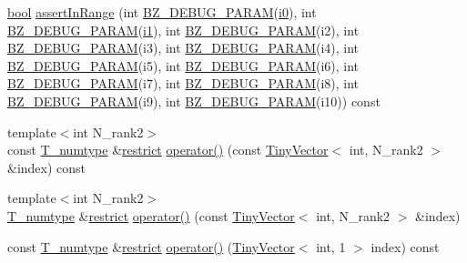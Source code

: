 \begin{DoxyCompactItemize}
\item 
\hyperlink{compiler_8h_abb452686968e48b67397da5f97445f5b}{bool} \hyperlink{classArray_ac1601ef44f92cc6b7bb767afbb1f159b}{assert\+In\+Range} (int \hyperlink{bzdebug_8h_a8da20913b848afd5500d54e384544e20}{B\+Z\+\_\+\+D\+E\+B\+U\+G\+\_\+\+P\+A\+R\+A\+M}(\hyperlink{cephes_8h_aacd2643d920288e61be16787561a4514}{i0}), int \hyperlink{bzdebug_8h_a8da20913b848afd5500d54e384544e20}{B\+Z\+\_\+\+D\+E\+B\+U\+G\+\_\+\+P\+A\+R\+A\+M}(\hyperlink{cephes_8h_ab24474d03df1f9adf1700c2c1badd1a5}{i1}), int \hyperlink{bzdebug_8h_a8da20913b848afd5500d54e384544e20}{B\+Z\+\_\+\+D\+E\+B\+U\+G\+\_\+\+P\+A\+R\+A\+M}(i2), int \hyperlink{bzdebug_8h_a8da20913b848afd5500d54e384544e20}{B\+Z\+\_\+\+D\+E\+B\+U\+G\+\_\+\+P\+A\+R\+A\+M}(i3), int \hyperlink{bzdebug_8h_a8da20913b848afd5500d54e384544e20}{B\+Z\+\_\+\+D\+E\+B\+U\+G\+\_\+\+P\+A\+R\+A\+M}(i4), int \hyperlink{bzdebug_8h_a8da20913b848afd5500d54e384544e20}{B\+Z\+\_\+\+D\+E\+B\+U\+G\+\_\+\+P\+A\+R\+A\+M}(i5), int \hyperlink{bzdebug_8h_a8da20913b848afd5500d54e384544e20}{B\+Z\+\_\+\+D\+E\+B\+U\+G\+\_\+\+P\+A\+R\+A\+M}(i6), int \hyperlink{bzdebug_8h_a8da20913b848afd5500d54e384544e20}{B\+Z\+\_\+\+D\+E\+B\+U\+G\+\_\+\+P\+A\+R\+A\+M}(i7), int \hyperlink{bzdebug_8h_a8da20913b848afd5500d54e384544e20}{B\+Z\+\_\+\+D\+E\+B\+U\+G\+\_\+\+P\+A\+R\+A\+M}(i8), int \hyperlink{bzdebug_8h_a8da20913b848afd5500d54e384544e20}{B\+Z\+\_\+\+D\+E\+B\+U\+G\+\_\+\+P\+A\+R\+A\+M}(i9), int \hyperlink{bzdebug_8h_a8da20913b848afd5500d54e384544e20}{B\+Z\+\_\+\+D\+E\+B\+U\+G\+\_\+\+P\+A\+R\+A\+M}(i10)) const 
\item 
{\footnotesize template$<$int N\+\_\+rank2$>$ }\\const \hyperlink{classArray_ae72770f4a1d2f8b7193badafc320f008}{T\+\_\+numtype} \&\hyperlink{compiler_8h_a080abdcb9c02438f1cd2bb707af25af8}{restrict} \hyperlink{classArray_af46886e921cc28b4a8572a7bd7973755}{operator()} (const \hyperlink{classTinyVector}{Tiny\+Vector}$<$ int, N\+\_\+rank2 $>$ \&index) const 
\item 
{\footnotesize template$<$int N\+\_\+rank2$>$ }\\\hyperlink{classArray_ae72770f4a1d2f8b7193badafc320f008}{T\+\_\+numtype} \&\hyperlink{compiler_8h_a080abdcb9c02438f1cd2bb707af25af8}{restrict} \hyperlink{classArray_a59f3e64e543670bc38a456493613a339}{operator()} (const \hyperlink{classTinyVector}{Tiny\+Vector}$<$ int, N\+\_\+rank2 $>$ \&index)
\item 
const \hyperlink{classArray_ae72770f4a1d2f8b7193badafc320f008}{T\+\_\+numtype} \&\hyperlink{compiler_8h_a080abdcb9c02438f1cd2bb707af25af8}{restrict} \hyperlink{classArray_a65cfd90e9df2299bd405ece006520484}{operator()} (\hyperlink{classTinyVector}{Tiny\+Vector}$<$ int, 1 $>$ index) const 

\end{DoxyCompactItemize}
